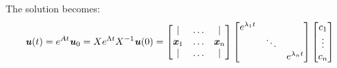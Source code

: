 \documentclass[12pt, letterpaper]{article}
\newcommand{\V}[1]{\textbf{\textit{#1}}}
\theoremstyle{definition}
\begin{document}
		\noindent The solution becomes:
		\begin{equation*}
			\V{u}(t) = e^{A t}\V{u}_0 = X e^{\Lambda t} X^{-1} \V{u}(0) = \begin{bmatrix}
																				|    & \ldots & | \\
																				\V{x}_1 & \ldots & \V{x}_n \\
																				|    & \ldots & |
																				\end{bmatrix}	\begin{bmatrix}
																									e^{\lambda_1 t}  &        &  \\
																									& \ddots &  \\
																									&        & e^{\lambda_n t}
																									\end{bmatrix} \begin{bmatrix}
																													c_1 \\
																													\vdots \\
																													c_n
																													\end{bmatrix}
		\end{equation*}
\end{document}
